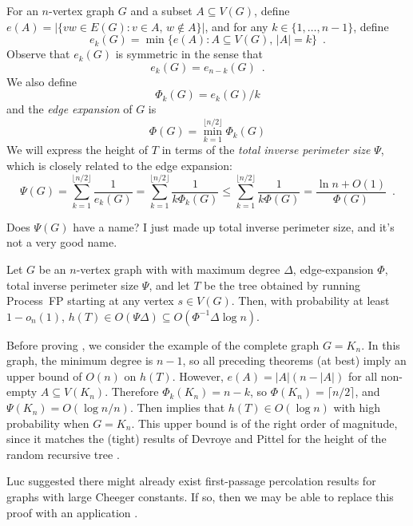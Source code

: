 \documentclass{patmorin}
\begin{document}
For an $n$-vertex graph $G$ and a subset $A\subseteq V(G)$,
define $e(A)=|\{vw\in E(G): v\in A,\, w\not\in A\}|$, and for any
$k\in\{1,\ldots,n-1\}$, define
\[
    e_k(G) = \min\{e(A) : A\subseteq V(G),\, |A|=k \} \enspace .
\]
Observe that $e_k(G)$ is symmetric in the sense that
\[
    e_k(G) = e_{n-k}(G) \enspace .
\]
We also define
\[
    \Phi_k(G) = e_k(G)/k
\]
and the \emph{edge expansion} of $G$ is
\[
    \Phi(G) = \min_{k=1}^{\lfloor n/2\rfloor}\Phi_k(G)
\]
We will express the height of $T$ in terms of the \emph{total inverse
perimeter size} $\Psi$, which is closely related to the edge expansion:
\[
    \Psi(G) = \sum_{k=1}^{\lfloor n/2\rfloor} \frac{1}{e_k(G)} 
            = \sum_{k=1}^{\lfloor n/2\rfloor} \frac{1}{k\Phi_k(G)}
            \le \sum_{k=1}^{\lfloor n/2\rfloor} \frac{1}{k\Phi(G)}
            = \frac{\ln n +O(1)}{\Phi(G)} \enspace .
\]

\begin{todo}
Does $\Psi(G)$ have a name?  I just made up total
inverse perimeter size, and it's not a very good name.
\end{todo}

\begin{thm}
  Let $G$ be an $n$-vertex graph with with maximum degree $\Delta$,
  edge-expansion $\Phi$, total inverse perimeter size $\Psi$,
  and let $T$ be the tree obtained by running Process~FP starting at
  any vertex $s\in V(G)$.  Then, with probability at least $1-o_n(1)$,
  $h(T) \in O(\Psi\Delta)\subseteq O(\Phi^{-1}\Delta\log n)$.
\end{thm}

Before proving , we
consider the example of the complete graph $G=K_n$.  In this graph,
the minimum degree is $n-1$, so all preceding theorems (at best)
imply an upper bound of $O(n)$ on $h(T)$.  However, $e(A)=|A|(n-|A|)$
for all non-empty $A\subseteq V(K_n)$. Therefore $\Phi_k(K_n) = n-k$,
so $\Phi(K_n) = \lceil n/2\rceil$, and $\Psi(K_n) = O(\log n/n)$.
Then  implies that $h(T)\in
O(\log n)$ with high probability when $G=K_n$.  This upper bound
is of the right order of magnitude, since it matches the (tight) results
of Devroye and Pittel for the height of the random recursive tree
\cite{devroye:branching,pittel:note}.

\begin{todo}
Luc suggested there might already exist first-passage
percolation results for graphs with large Cheeger constants.  If so,
then we may be able to replace this proof with an application
.
\end{todo}
\end{document}

